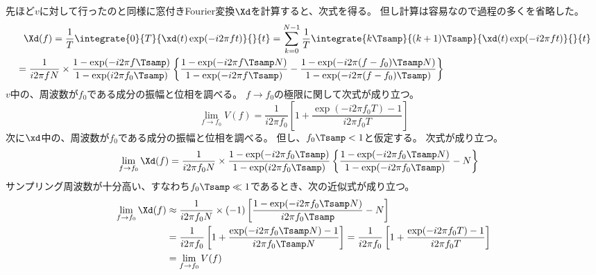             先ほど$v$に対して行ったのと同様に窓付きFourier変換$\Xd$を計算すると、次式を得る。
            但し計算は容易なので過程の多くを省略した。
            \begin{align*}
                &\phantom{=} \Xd(f) = \frac{1}{T} \integrate{0}{T}{\xd(t)\exp(-i 2\pi f t)}{}{t} = \sum_{k=0}^{N-1} \frac{1}{T} \integrate{k\Tsamp}{(k+1)\Tsamp}{\xd(t)\exp(-i 2\pi f t)}{}{t} \\
                &= \frac{1}{i 2\pi f N}\times\frac{1-\exp(-i 2\pi f\Tsamp)}{1-\exp(i 2\pi f_0\Tsamp)} \left\{\frac{1-\exp(-i 2\pi f \Tsamp N)}{1-\exp(-i 2\pi f \Tsamp)} - \frac{1-\exp(-i 2\pi (f-f_0) \Tsamp N)}{1-\exp(-i 2\pi (f-f_0) \Tsamp)}\right\}
            \end{align*}
            $v$中の、周波数が$f_0$である成分の振幅と位相を調べる。
            $f\to f_0$の極限に関して次式が成り立つ。
            \[ \lim_{f\to f_0} V(f) = \frac{1}{i2\pi f_0}\left[1 + \frac{\exp(-i 2\pi f_0 T)-1}{i 2\pi f_0 T}\right] \]
            次に$\xd$中の、周波数が$f_0$である成分の振幅と位相を調べる。
            但し、$f_0\Tsamp < 1$と仮定する。
            次式が成り立つ。
            \begin{align*}
                \lim_{f\to f_0} \Xd(f) &= \frac{1}{i 2\pi f_0 N}\times\frac{1-\exp(-i 2\pi f_0\Tsamp)}{1-\exp(i 2\pi f_0\Tsamp)}\left\{\frac{1-\exp(-i 2\pi f_0 \Tsamp N)}{1-\exp(-i 2\pi f_0 \Tsamp)} - N\right\}
            \end{align*}
            サンプリング周波数が十分高い、すなわち$f_0\Tsamp\ll 1$であるとき、次の近似式が成り立つ。
            \begin{align*}
                \lim_{f\to f_0} \Xd(f) &\approx \frac{1}{i 2\pi f_0 N}\times(-1)\left[\frac{1-\exp(-i 2\pi f_0 \Tsamp N)}{i 2\pi f_0 \Tsamp} - N\right] \\
                &= \frac{1}{i 2\pi f_0}\left[1 + \frac{\exp(-i 2\pi f_0 \Tsamp N)-1}{i 2\pi f_0 \Tsamp N}\right] = \frac{1}{i 2\pi f_0}\left[1 + \frac{\exp(-i 2\pi f_0 T)-1}{i 2\pi f_0 T}\right] \\
                &=  \lim_{f\to f_0} V(f)
            \end{align*}
